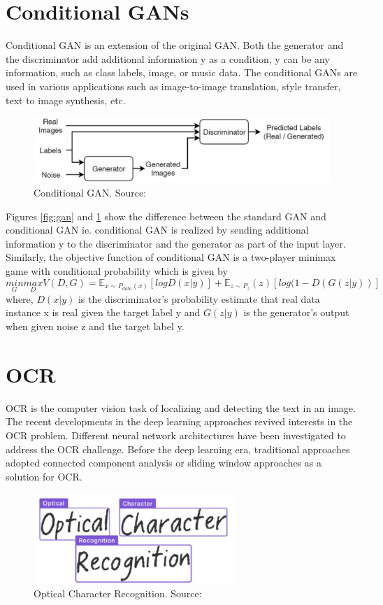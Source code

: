\section{Conditional GANs}
	Conditional GAN is an extension of the original GAN. Both the generator and the discriminator add additional information y as a condition, y can be any information, such as class labels, image, or music data. The conditional GANs are used in various applications such as image-to-image translation, style transfer, text to image synthesis, etc.
\newline
\begin{figure}[H]
\centering
\includegraphics[width=5in]{images/cgan.jpg}
\caption[Conditional GAN]{Conditional GAN. Source: \citep{gans}}
\label{fig:cgan}
\end{figure}	
	
	 Figures \ref{fig:gan} and \ref{fig:cgan} show the difference between the standard GAN and conditional GAN ie. conditional GAN is realized by sending additional information y to the discriminator and the generator as part of the input layer. Similarly, the objective function of conditional GAN is a two-player minimax game with conditional probability \citep{isola2017image} which is given by
\begin{equation*}
\underset{G}{min} \underset{D}{max} V(D,G)=\mathbb{E}_{x\sim P_{data}(x)} [log D(x|y)] + \mathbb{E}_{z\sim P_{z}}(z) [log(1-D(G(z|y))]
\end{equation*}
where,
$D(x|y)$ is the discriminator's probability estimate that real data instance x is real given the target label y and $G(z|y)$ is the generator's output when given noise z and the target label y.
\section{OCR}
OCR is the computer vision task of localizing and detecting the text in an image. The recent developments in the deep learning approaches revived interests in the OCR problem. Different neural network architectures have been investigated to address the OCR challenge. Before the deep learning era, traditional approaches adopted connected component analysis or sliding window approaches as a solution for OCR. 
\begin{figure}[H]
\centering
\includegraphics[width=3in,scale=1]{images/ocr.png}
\caption[Optical Character Recognition]{Optical Character Recognition. Source: \citep{ocr}}
\label{fig:neuron}
\end{figure}

